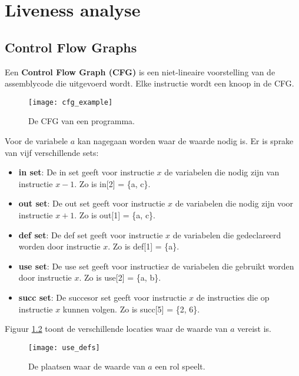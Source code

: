 \chapter{Liveness analyse}

\section{Control Flow Graphs}
Een \textbf{Control Flow Graph (CFG)} is een niet-lineaire voorstelling van de assemblycode die uitgevoerd wordt. Elke instructie wordt een knoop in de CFG.

\begin{figure}[ht]
	
	\texttt{[image: cfg\_example]}
	\caption{De CFG van een programma.}
	\label{fig:cfg_example}
\end{figure}



Voor de variabele $a$ kan nagegaan worden waar de waarde nodig is. Er is sprake van vijf verschillende sets:
\begin{itemize}
	\item \textbf{in set}:  De in set geeft voor instructie $x$ de variabelen die nodig zijn van instructie $x - 1$. Zo is in[2] = \{a, c\}.
	\item \textbf{out set}: De out set geeft voor instructie $x$ de variabelen die nodig zijn voor instructie $x + 1$. Zo is out[1] = \{a, c\}.
	\item \textbf{def set}: De def set geeft voor instructie $x$ de variabelen die gedeclareerd worden door instructie $x$. Zo is def[1] = \{a\}.
	\item \textbf{use set}: De use set geeft voor instructie$x$ de variabelen die gebruikt worden door instructie $x$. Zo is use[2] = \{a, b\}.
	\item \textbf{succ set}: De succesor set geeft voor instructie $x$ de instructies die op instructie $x$ kunnen volgen. Zo is succ[5] = \{2, 6\}.
\end{itemize}

Figuur \ref{fig:use_defs} toont de verschillende locaties waar de waarde van $a$ vereist is.

\begin{figure}[ht]
	\centering
	\texttt{[image: use\_defs]}
	\caption{De plaatsen waar de waarde van $a$ een rol speelt.}
	\label{fig:use_defs}
\end{figure}

